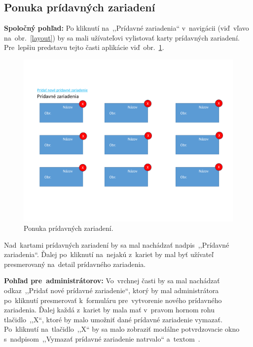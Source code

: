 \subsection{Ponuka prídavných zariadení}
\label{ponuka pridavnych zariadeni}

\textbf{Spoločný pohľad:} Po kliknutí na~,,Prídavné zariadenia`` v~navigácii (viď~vľavo na~obr.~\ref{layout}) by sa mali užívateľovi vylistovať karty prídavných zariadení. Pre~lepšiu predstavu tejto časti aplikácie viď~obr.~\ref{additional equipment cards}.

\begin{figure}[H]\centering
\includegraphics[width=140mm]{../img/UI concept/additional equipment cards}
\caption{Ponuka prídavných zariadení.}
\label{additional equipment cards}
\end{figure}

Nad~kartami prídavných zariadení by sa mal nachádzať nadpis~,,Prídavné zariadenia``. Ďalej po~kliknutí na~nejakú z~kariet by mal byť užívateľ presmerovaný na~detail prídavného zariadenia.

\textbf{Pohľad pre~administrátorov:} Vo~vrchnej časti by sa mal nachádzať odkaz~,,Pridať nové prídavné zariadenie``, ktorý by mal administrátora po~kliknutí presmerovať k~formuláru pre~vytvorenie nového prídavného zariadenia. Ďalej každá z~kariet by mala mať v~pravom hornom rohu tlačidlo~,,X``, ktoré by malo umožniť dané prídavné zariadenie vymazať. Po~kliknutí na~tlačidlo~,,X`` by sa malo zobraziť modálne potvrdzovacie okno s~nadpisom~,,Vymazať prídavné zariadenie natrvalo`` a~textom~.
\newpage
